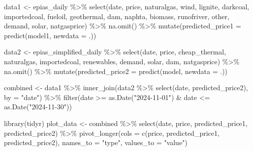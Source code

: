 \documentclass[
]{article}
\newenvironment{Shaded}{\begin{snugshade}}{\end{snugshade}}
\newcommand{\AttributeTok}[1]{\textcolor[rgb]{0.40,0.45,0.13}{#1}}
\newcommand{\FunctionTok}[1]{\textcolor[rgb]{0.28,0.35,0.67}{#1}}
\newcommand{\NormalTok}[1]{\textcolor[rgb]{0.00,0.23,0.31}{#1}}
\newcommand{\OtherTok}[1]{\textcolor[rgb]{0.00,0.23,0.31}{#1}}
\newcommand{\SpecialCharTok}[1]{\textcolor[rgb]{0.37,0.37,0.37}{#1}}
\newcommand{\StringTok}[1]{\textcolor[rgb]{0.13,0.47,0.30}{#1}}
\begin{document}
\begin{Shaded}
\begin{Highlighting}[]
\NormalTok{data1 }\OtherTok{\textless{}{-}}\NormalTok{ epias\_daily }\SpecialCharTok{\%\textgreater{}\%}
  \FunctionTok{select}\NormalTok{(date, price, naturalgas, wind, lignite, darkcoal, importedcoal, fueloil, geothermal, dam, naphta, biomass, runofriver, other, demand, solar, natgasprice) }\SpecialCharTok{\%\textgreater{}\%}
  \FunctionTok{na.omit}\NormalTok{() }\SpecialCharTok{\%\textgreater{}\%}
  \FunctionTok{mutate}\NormalTok{(}\AttributeTok{predicted\_price1 =} \FunctionTok{predict}\NormalTok{(model1, }\AttributeTok{newdata =}\NormalTok{ .))}

\NormalTok{data2 }\OtherTok{\textless{}{-}}\NormalTok{ epias\_simplified\_daily }\SpecialCharTok{\%\textgreater{}\%}
  \FunctionTok{select}\NormalTok{(date, price, cheap\_thermal, naturalgas, importedcoal, renewables, demand, solar, dam, natgasprice) }\SpecialCharTok{\%\textgreater{}\%}
  \FunctionTok{na.omit}\NormalTok{() }\SpecialCharTok{\%\textgreater{}\%}
  \FunctionTok{mutate}\NormalTok{(}\AttributeTok{predicted\_price2 =} \FunctionTok{predict}\NormalTok{(model, }\AttributeTok{newdata =}\NormalTok{ .))}


\NormalTok{combined }\OtherTok{\textless{}{-}}\NormalTok{ data1 }\SpecialCharTok{\%\textgreater{}\%}
  \FunctionTok{inner\_join}\NormalTok{(data2 }\SpecialCharTok{\%\textgreater{}\%} \FunctionTok{select}\NormalTok{(date, predicted\_price2), }\AttributeTok{by =} \StringTok{"date"}\NormalTok{) }\SpecialCharTok{\%\textgreater{}\%}
  \FunctionTok{filter}\NormalTok{(date }\SpecialCharTok{\textgreater{}=} \FunctionTok{as.Date}\NormalTok{(}\StringTok{"2024{-}11{-}01"}\NormalTok{) }\SpecialCharTok{\&}\NormalTok{ date }\SpecialCharTok{\textless{}=} \FunctionTok{as.Date}\NormalTok{(}\StringTok{"2024{-}11{-}30"}\NormalTok{))}


\FunctionTok{library}\NormalTok{(tidyr)}
\NormalTok{plot\_data }\OtherTok{\textless{}{-}}\NormalTok{ combined }\SpecialCharTok{\%\textgreater{}\%}
  \FunctionTok{select}\NormalTok{(date, price, predicted\_price1, predicted\_price2) }\SpecialCharTok{\%\textgreater{}\%}
  \FunctionTok{pivot\_longer}\NormalTok{(}\AttributeTok{cols =} \FunctionTok{c}\NormalTok{(price, predicted\_price1, predicted\_price2),}
               \AttributeTok{names\_to =} \StringTok{"type"}\NormalTok{, }\AttributeTok{values\_to =} \StringTok{"value"}\NormalTok{)}



\end{Highlighting}
\end{Shaded}
\end{document}
